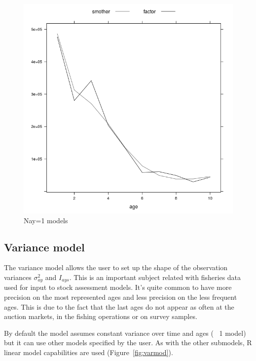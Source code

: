 \documentclass[a4paper,english,10pt]{article}\usepackage[]{graphicx}\usepackage[]{color}
\newenvironment{knitrout}{}{} %
\begin{document}
\begin{knitrout}
\color{fgcolor}\begin{figure}[H]

{\centering \includegraphics[width=.9\linewidth]{figure/ny1-1} 

}

\caption[Nay=1 models]{Nay=1 models}\label{fig:ny1}
\end{figure}


\end{knitrout}

\subsection{Variance model}

The variance model allows the user to set up the shape of the observation variances $\sigma^2_{ay}$ and $I_{ays}$. This is an important subject related with fisheries data used for input to stock assessment models. It's quite common to have more precision on the most represented ages and less precision on the less frequent ages. This is due to the fact that the last ages do not appear as often at the auction markets, in the fishing operations or on survey samples.

By default the model assumes constant variance over time and ages (~ 1 model) but it can use other models specified by the user. As with the other submodels, R linear model capabilities are used (Figure~\ref{fig:varmod}).
\end{document}
